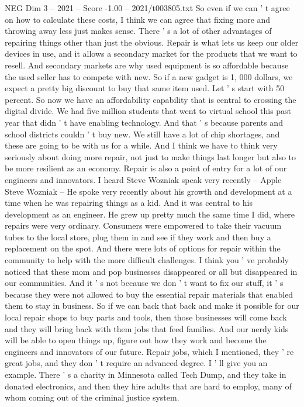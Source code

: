 \begin{textsample}{NEG Dim 3 – 2021 – Score -1.00 – 2021/t003805.txt}
So even if we can ' t agree on how to calculate these costs, I think we can agree that fixing more and throwing away less just makes sense.
There ' s a lot of other advantages of repairing things other than just the obvious.
Repair is what lets us keep our older devices in use, and it allows a secondary market for the products that we want to resell.
And secondary markets are why used equipment is so affordable because the used seller has to compete with new.
So if a new gadget is 1, 000 dollars, we expect a pretty big discount to buy that same item used.
Let ' s start with 50 percent.
So now we have an affordability capability that is central to crossing the digital divide.
We had five million students that went to virtual school this past year that didn ' t have enabling technology.
And that ' s because parents and school districts couldn ' t buy new.
We still have a lot of chip shortages, and these are going to be with us for a while.
And I think we have to think very seriously about doing more repair, not just to make things last longer but also to be more resilient as an economy.
Repair is also a point of entry for a lot of our engineers and innovators.
I heard Steve Wozniak speak very recently -- Apple Steve Wozniak -- He spoke very recently about his growth and development at a time when he was repairing things as a kid.
And it was central to his development as an engineer.
He grew up pretty much the same time I did, where repairs were very ordinary.
Consumers were empowered to take their vacuum tubes to the local store, plug them in and see if they work and then buy a replacement on the spot.
And there were lots of options for repair within the community to help with the more difficult challenges.
I think you ' ve probably noticed that these mom and pop businesses disappeared or all but disappeared in our communities.
And it ' s not because we don ' t want to fix our stuff, it ' s because they were not allowed to buy the essential repair materials that enabled them to stay in business.
So if we can back that back and make it possible for our local repair shops to buy parts and tools, then those businesses will come back and they will bring back with them jobs that feed families.
And our nerdy kids will be able to open things up, figure out how they work and become the engineers and innovators of our future.
Repair jobs, which I mentioned, they ' re great jobs, and they don ' t require an advanced degree.
I ' ll give you an example.
There ' s a charity in Minnesota called Tech Dump, and they take in donated electronics, and then they hire adults that are hard to employ, many of whom coming out of the criminal justice system.

\end{textsample}
